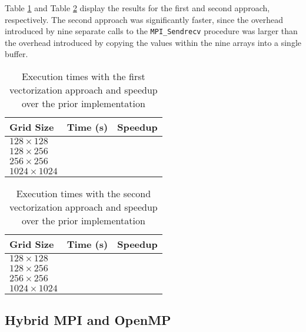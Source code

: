 \documentclass[twocolumn, a4paper]{article}
\begin{document}
Table \ref{tab:vectorization_1} and Table \ref{tab:vectorization_2} display the results for the first and second approach, respectively.
The second approach was significantly faster, since the overhead introduced by nine separate calls to the \texttt{MPI\_Sendrecv} procedure was larger than the overhead introduced by copying the values within the nine arrays into a single buffer.

\begin{table}[htbp]
  \begin{center}
  \caption{Execution times with the first vectorization approach and speedup over the prior implementation}\label{tab:vectorization_1}
  \begin{tabular}[t]{l | l l} 
      \hline\hline
      Grid Size&Time (s)&Speedup\\
      \hline
      $128 \times 128$&\texttt{}&\texttt{}\\
      $128 \times 256$&\texttt{}&\texttt{}\\
      $256 \times 256$&\texttt{}&\texttt{}\\
      $1024 \times 1024$&\texttt{}&\texttt{}\\
      \hline
    \end{tabular}
  \end{center}
\end{table}

\begin{table}[htbp]
  \begin{center}
  \caption{Execution times with the second vectorization approach and speedup over the prior implementation}\label{tab:vectorization_2}
  \begin{tabular}[t]{l | l l} 
      \hline\hline
      Grid Size&Time (s)&Speedup\\
      \hline
      $128 \times 128$&\texttt{}&\texttt{}\\
      $128 \times 256$&\texttt{}&\texttt{}\\
      $256 \times 256$&\texttt{}&\texttt{}\\
      $1024 \times 1024$&\texttt{}&\texttt{}\\
      \hline
    \end{tabular}
  \end{center}
\end{table}

\subsection{Hybrid MPI and OpenMP}
\end{document}

